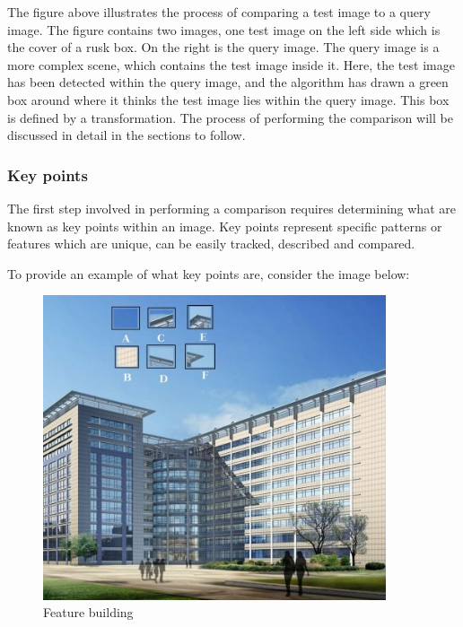 \documentclass[11pt,a4paper]{report}
\begin{document}
					The figure above illustrates the process of comparing a test image to a query image. The figure contains two images, one test image on the left side which is the cover of a rusk box. On the right is the query image. The query image is a more complex scene, which contains the test image inside it. Here, the test image has been detected within the query image, and the algorithm has drawn a green box around where it thinks the test image lies within the query image. This box is defined by a transformation. The process of performing the comparison will be discussed in detail in the sections to follow.
				
				\subsubsection{Key points}
					The first step involved in performing a comparison requires determining what are known as key points within an image. Key points represent specific patterns or features which are unique, can be easily tracked, described and compared.
					
					To provide an example of what key points are, consider the image below:
					
					\begin{figure}[H]
						\centering
						\includegraphics[width=0.9\textwidth]{feature_building}
						\caption{Feature building}
					\end{figure}
					
\end{document}
